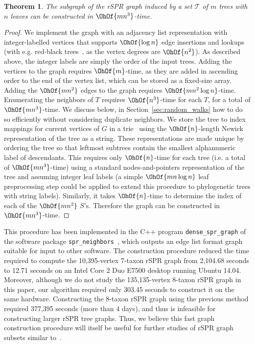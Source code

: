 \documentclass[11pt,onecolumn,conference]{IEEEtran}
\newtheorem{theorem}{Theorem}[section]
\begin{document}
\begin{theorem}
	\label{thm:construct_graph}
	The subgraph of the rSPR graph induced by a set $\mathcal{T}$ of $m$ trees with $n$ leaves can be constructed in $\OhOf{mn^3}$-time.
\end{theorem}
\begin{proof}
	We implement the graph with an adjacency list representation with integer-labelled vertices that supports $\OhOf{\log n}$ edge insertions and lookups (with e.g. red-black trees~\cite{guibas1978dichromatic}, as the vertex degrees are $\OhOf{n^2}$).
	As described above, the integer labels are simply the order of the input trees.
	Adding the vertices to the graph requires $\OhOf{m}$-time, as they are added in ascending order to the end of the vertex list, which can be stored as a fixed-size array.
	Adding the $\OhOf{mn^2}$ edges to the graph requires $\OhOf{mn^2 \log n}$-time.
	Enumerating the neighbors of $T$ requires $\OhOf{n^3}$-time for each $T$, for a total of $\OhOf{mn^3}$-time.
	We discuss below, in Section~\ref{sec:random_walks} how to do so efficiently without considering duplicate neighbors.
	We store the tree to index mappings for current vertices of $G$ in a trie~\cite{fredkin1960trie} using the $\OhOf{n}$-length Newick \cite{wiki:newick} representation of the tree as a string.
	These representations are made unique by ordering the tree so that leftmost subtrees contain the smallest alphanumeric label of descendants.
	This requires only $\OhOf{n}$-time for each tree (i.e. a total of $\OhOf{mn^3}$-time) using a standard nodes-and-pointers representation of the tree and assuming integer leaf labels (a simple $\OhOf{mn\log n}$ leaf preprocessing step could be applied to extend this procedure to phylogenetic trees with string labels).
	Similarly, it takes $\OhOf{n}$-time to determine the index of each of the $\OhOf{mn^2}$ $S$'s.
	Therefore the graph can be constructed in $\OhOf{mn^3}$-time.
\end{proof}
This procedure has been implemented in the C++ program \texttt{dense\_spr\_graph} of the software package \texttt{spr\_neighbors}~\cite{spr_neighbors}, which outputs an edge list format graph suitable for input to other software.
The construction procedure reduced the time required to compute the 10,395-vertex 7-taxon rSPR graph from 2,104.68 seconds to 12.71 seconds on an Intel Core 2 Duo E7500 desktop running Ubuntu 14.04.
Moreover, although we do not study the 135,135-vertex 8-taxon rSPR graph in this paper, our algorithm required only 303.45 seconds to construct it on the same hardware.
Constructing the 8-taxon rSPR graph using the previous method required 377,395 seconds (more than 4 days), and thus is infeasible for constructing larger rSPR tree graphs.
Thus, we believe this fast graph construction procedure will itself be useful for further studies of rSPR graph subsets similar to~\cite{Whidden2015-yi}.
\end{document}
